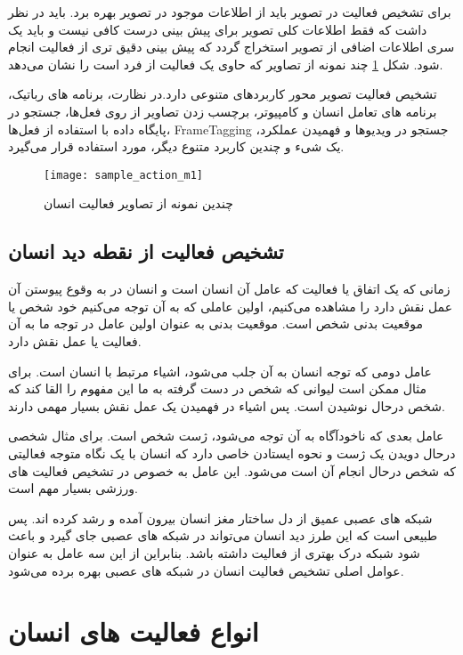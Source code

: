 برای تشخیص فعالیت در تصویر باید از اطلاعات موجود در تصویر بهره برد. باید در نظر داشت که فقط اطلاعات کلی تصویر برای پیش بینی درست کافی نیست و باید یک سری اطلاعات اضافی از تصویر استخراج گردد که پیش بینی دقیق تری از فعالیت انجام شود.
شکل
\ref{fig:humanActionM1}
چند نمونه از تصاویر که حاوی یک فعالیت از فرد است را نشان می‌دهد.

تشخیص فعالیت تصویر محور کاربردهای متنوعی دارد.در نظارت، برنامه های رباتیک،‌ برنامه های تعامل انسان و کامپیوتر، برچسب زدن تصاویر از روی فعل‌ها، جستجو در پایگاه داده با استفاده از فعل‌ها، %
\gls{FrameTagging}
،جستجو در ویدیوها و فهمیدن عملکرد یک شیء و چندین کاربرد متنوع دیگر، مورد استفاده قرار می‌گیرد.
~\cite{UnderstandingActionRecogAll}

\begin{figure}[ht]
	\centerline{\texttt{[image: sample\_action\_m1]}}
	\caption[چندین نمونه از تصاویر فعالیت انسان]{چندین نمونه از تصاویر فعالیت انسان
		~\cite{tasvirAvalChapterYek}
	}
	\label{fig:humanActionM1}
\end{figure}
\subsection{تشخیص فعالیت از نقطه دید انسان}
زمانی که یک اتفاق یا فعالیت که عامل آن انسان است و انسان در به وقوع پیوستن آن عمل نقش دارد را مشاهده می‌کنیم، اولین عاملی که به آن توجه می‌کنیم خود شخص یا موقعیت بدنی شخص است. موقعیت بدنی به عنوان اولین عامل در توجه ما به آن فعالیت یا عمل نقش دارد.

عامل دومی که توجه انسان به آن جلب می‌شود، اشیاء مرتبط با انسان است. برای مثال ممکن است لیوانی که شخص در دست گرفته به ما این مفهوم را القا کند که شخص درحال نوشیدن است. پس اشیاء در فهمیدن یک عمل نقش بسیار مهمی دارند.

عامل بعدی که ناخودآگاه به آن توجه می‌شود، ژست شخص است. برای مثال شخصی درحال دویدن یک ژست و نحوه ایستادن خاصی دارد که انسان با یک نگاه متوجه فعالیتی که شخص درحال انجام آن است می‌شود. این عامل به خصوص در تشخیص فعالیت های ورزشی بسیار مهم است.

شبکه های عصبی عمیق از دل ساختار مغز انسان بیرون آمده و رشد کرده اند. پس طبیعی است که این طرز دید انسان می‌تواند در شبکه های عصبی جای گیرد و باعث شود شبکه درک بهتری از فعالیت داشته باشد. بنابراین از این سه عامل به عنوان عوامل اصلی تشخیص فعالیت انسان در شبکه های عصبی بهره برده می‌شود.

\section{انواع فعالیت های انسان}

